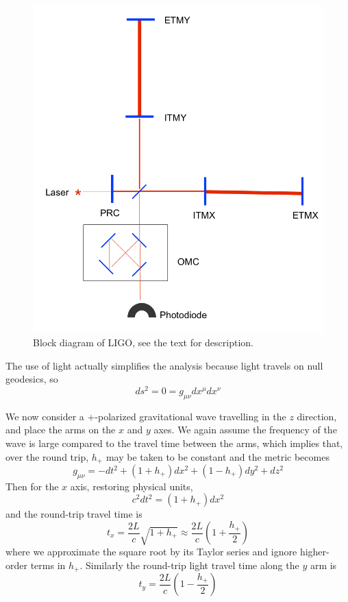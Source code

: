 \begin{figure}
  \includegraphics[width=\linewidth]{figures/detectors/LIGO}
  \caption[Block diagram of LIGO]{
  \label{f:ligo}
Block diagram of LIGO, see the text for description.
}
\end{figure}%
The use of light actually simplifies the analysis because light
travels on null geodesics, so
%
\begin{equation*}
ds^2 = 0 = g_{\mu\nu} dx^\mu dx^\nu
\end{equation*}

We now consider a +-polarized gravitational wave travelling in the $z$
direction, and place the arms on the $x$ and $y$ axes.  We again
assume the frequency of the wave is large compared to the travel time
between the arms, which implies that, over the round trip, $h_+$ may be
taken to be constant and the metric becomes
%
\begin{equation*}
g_{\mu\nu} = -dt^2 + (1+h_+) dx^2 + (1-h_+) dy^2 + dz^2
\end{equation*}
%
Then for the $x$ axis, restoring physical units,
%
\begin{equation*}
c^2 dt^2 = (1+h_+) dx^2
\end{equation*}
%
and the round-trip travel time is
%
\begin{equation*}
t_x = \frac{2L}{c} \sqrt{1+h_+} \approx \frac{2L}{c} \left(1+\frac{h_+}{2} \right)
\end{equation*}
%
where we approximate the square root by its Taylor series and ignore
higher-order terms in $h_+$.  Similarly the round-trip light travel
time along the $y$ arm is
%
\begin{equation*}
t_y = \frac{2L}{c} \left(1-\frac{h_+}{2} \right)
\end{equation*}

